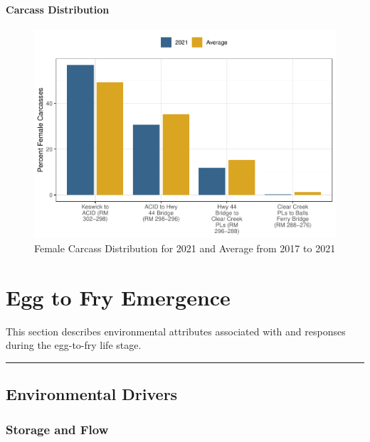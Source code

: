 \documentclass[
]{book}
\theoremstyle{definition}
\theoremstyle{definition}
\theoremstyle{definition}
\theoremstyle{definition}
\theoremstyle{remark}
\begin{document}
\hypertarget{carcass-distribution}{%
\subsubsection{Carcass Distribution}\label{carcass-distribution}}

\begin{figure}
\centering
\includegraphics{_main_files/figure-latex/carcassdistrib-fig-1.pdf}
\caption{\label{fig:carcassdistrib-fig}Female Carcass Distribution for 2021 and Average from 2017 to 2021}
\end{figure}

\hypertarget{egg-to-fry-emergence}{%
\chapter{Egg to Fry Emergence}\label{egg-to-fry-emergence}}

This section describes environmental attributes associated with and responses during the egg-to-fry life stage.

\begin{center}\rule{0.5\linewidth}{0.5pt}\end{center}

\hypertarget{environmental-drivers}{%
\section{Environmental Drivers}\label{environmental-drivers}}

\hypertarget{storage-and-flow-1}{%
\subsection{Storage and Flow}\label{storage-and-flow-1}}
\end{document}

